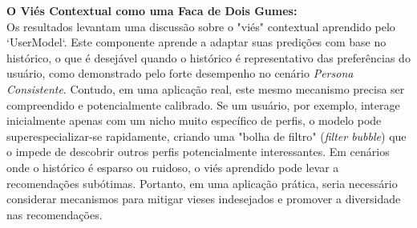 \textbf{O Viés Contextual como uma Faca de Dois Gumes:} \\
Os resultados levantam uma discussão sobre o "viés" contextual aprendido pelo `UserModel`. Este componente aprende a adaptar suas predições com base no histórico, o que é desejável quando o histórico é representativo das preferências do usuário, como demonstrado pelo forte desempenho no cenário \textit{Persona Consistente}. Contudo, em uma aplicação real, este mesmo mecanismo precisa ser compreendido e potencialmente calibrado. Se um usuário, por exemplo, interage inicialmente apenas com um nicho muito específico de perfis, o modelo pode superespecializar-se rapidamente, criando uma "bolha de filtro" (\textit{filter bubble}) que o impede de descobrir outros perfis potencialmente interessantes. Em cenários onde o histórico é esparso ou ruidoso, o viés aprendido pode levar a recomendações subótimas. Portanto, em uma aplicação prática, seria necessário considerar mecanismos para mitigar vieses indesejados e promover a diversidade nas recomendações.